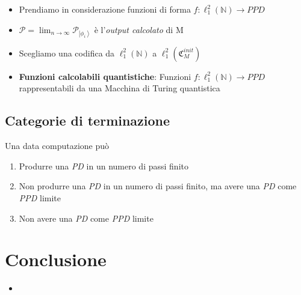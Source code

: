 \documentclass{beamer}
\begin{document}
\begin{frame}{\secname}{\subsecname}
	\begin{itemize}
		\item Prendiamo in considerazione funzioni di forma \( f : \ell^{2}_{1} \left ( \mathbb{N} \right ) \rightarrow PPD \)
		\item \( \mathcal{P} = \lim_{n \to \infty} \mathcal{P}_{\left | \phi_{i} \right \rangle} \) è l'\textit{output calcolato} di M
		\item Scegliamo una codifica da \( \ell^{2}_{1} \left ( \mathbb{N} \right ) \) a \( \ell^{2}_{1} \left ( \mathfrak{C}^{init}_M \right ) \)
		\item \textbf{Funzioni calcolabili quantistiche}: Funzioni \( f : \ell^{2}_{1} \left ( \mathbb{N} \right ) \rightarrow PPD \) rappresentabili da una Macchina di Turing quantistica
	\end{itemize}
\end{frame}

\subsection{Categorie di terminazione}

\begin{frame}{\subsecname}{}
	Una data computazione può
	\begin{enumerate}
		\item Produrre una \textit{PD} in un numero di passi finito
		\item Non produrre una \textit{PD} in un numero di passi finito, ma avere una \textit{PD} come \textit{PPD} limite
		\item Non avere una \textit{PD} come \textit{PPD} limite
	\end{enumerate}
\end{frame}

\section{Conclusione}

\begin{frame}{\secname}{}
	\begin{itemize}
		\item
	\end{itemize}
\end{frame}
\end{document}
